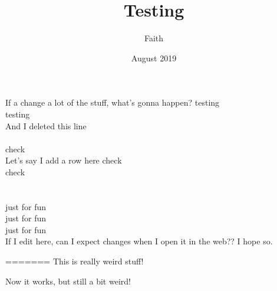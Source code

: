\documentclass{article}
\title{Testing}
\date{August 2019}
\author{Faith}
\begin{document}
\maketitle
If a change a lot of the stuff, what's gonna happen?
testing \\
testing\\
And I deleted this line
\\
\\
check\\


Let's say I add a row here
check\\
check\\
\\
\\
just for fun
\\
just for fun
\\
just for fun
\\

If I edit here, can I expect changes when I open it in the web?? I hope so.


=======
This is really weird stuff!


Now it works, but still a bit weird!
\end{document}
